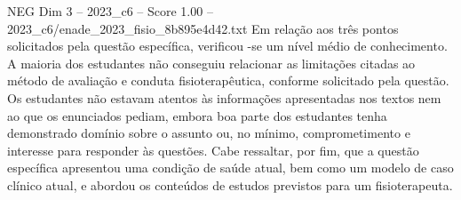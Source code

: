 \begin{textsample}{NEG Dim 3 – 2023\_c6 – Score 1.00 – 2023\_c6/enade\_2023\_fisio\_8b895e4d42.txt}
Em relação aos três pontos solicitados pela questão específica, verificou -se um nível médio de conhecimento.
A maioria dos estudantes não conseguiu relacionar as limitações citadas ao método de avaliação e conduta fisioterapêutica, conforme solicitado pela questão.
Os estudantes não estavam atentos às informações apresentadas nos textos nem ao que os enunciados pediam, embora boa parte dos estudantes tenha demonstrado domínio sobre o assunto ou, no mínimo, comprometimento e interesse para responder às questões.
Cabe ressaltar, por fim, que a questão específica apresentou uma condição de saúde atual, bem como um modelo de caso clínico atual, e abordou os conteúdos de estudos previstos para um fisioterapeuta.

\end{textsample}
